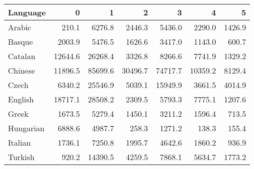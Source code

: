 \begin{tabular}{lrrrrrr}
\toprule
 Language   &       0 &       1 &       2 &       3 &       4 &      5 \\
\midrule
 Arabic     &   \num{210.1} &  \num{6276.8} &  \num{2446.3} &  \num{5436.0} &  \num{2290.0} & \num{1426.9} \\
 Basque     &  \num{2003.9} &  \num{5476.5} &  \num{1626.6} &  \num{3417.0} &  \num{1143.0} &  \num{600.7} \\
 Catalan    & \num{12644.6} & \num{26268.4} &  \num{3326.8} &  \num{8266.6} &  \num{7741.9} & \num{1329.2} \\
 Chinese    & \num{11896.5} & \num{85699.6} & \num{30496.7} & \num{74717.7} & \num{10359.2} & \num{8129.4} \\
 Czech      &  \num{6340.2} & \num{25546.9} &  \num{5039.1} & \num{15949.9} &  \num{3661.5} & \num{4014.9} \\
 English    & \num{18717.1} & \num{28508.2} &  \num{2309.5} &  \num{5793.3} &  \num{7775.1} & \num{1207.6} \\
 Greek      &  \num{1673.5} &  \num{5279.4} &  \num{1450.1} &  \num{3211.2} &  \num{1596.4} &  \num{713.5} \\
 Hungarian  &  \num{6888.6} &  \num{4987.7} &   \num{258.3} &  \num{1271.2} &   \num{138.3} &  \num{155.4} \\
 Italian    &  \num{1736.1} &  \num{7250.8} &  \num{1995.7} &  \num{4642.6} &  \num{1860.2} &  \num{936.9} \\
 Turkish    &   \num{920.2} & \num{14390.5} &  \num{4259.5} &  \num{7868.1} &  \num{5634.7} & \num{1773.2} \\
\bottomrule
\end{tabular}